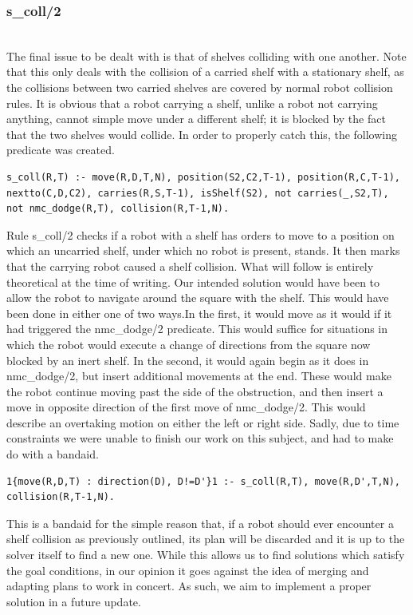 \documentclass{llncs}
\begin{document}
\subsubsection{s\_coll/2}\hfill\\
The final issue to be dealt with is that of shelves colliding with one another. Note that this only deals with the collision of a carried shelf with a stationary shelf, as the collisions between two carried shelves are covered by normal robot collision rules.\newline
It is obvious that a robot carrying a shelf, unlike a robot not carrying anything, cannot simple move under a different shelf; it is blocked by the fact that the two shelves would collide. In order to properly catch this, the following predicate was created.
\begin{lstlisting}[basicstyle=\fontsize{9}{11}\selectfont\ttfamily,frame=single,breaklines=true]
s_coll(R,T) :- move(R,D,T,N), position(S2,C2,T-1), position(R,C,T-1), nextto(C,D,C2), carries(R,S,T-1), isShelf(S2), not carries(_,S2,T), not nmc_dodge(R,T), collision(R,T-1,N).
\end{lstlisting}
Rule s\_coll/2 checks if a robot with a shelf has orders to move to a position on which an uncarried shelf, under which no robot is present, stands. It then marks that the carrying robot caused a shelf collision.\newline\newline
What will follow is entirely theoretical at the time of writing. Our intended solution would have been to allow the robot to navigate around the square with the shelf. This would have been done in either one of two ways.\newline In the first, it would move as it would if it had triggered the nmc\_dodge/2 predicate. This would suffice for situations in which the robot would execute a change of directions from the square now blocked by an inert shelf.\newline
In the second, it would again begin as it does in nmc\_dodge/2, but insert additional movements at the end. These would make the robot continue moving past the side of the obstruction, and then insert a move in opposite direction of the first move of nmc\_dodge/2. This would describe an overtaking motion on either the left or right side. \newline\newline
Sadly, due to time constraints we were unable to finish our work on this subject, and had to make do with a bandaid.
\begin{lstlisting}[basicstyle=\fontsize{9}{11}\selectfont\ttfamily,frame=single,breaklines=true]
1{move(R,D,T) : direction(D), D!=D'}1 :- s_coll(R,T), move(R,D',T,N), collision(R,T-1,N).
\end{lstlisting}
This is a bandaid for the simple reason that, if a robot should ever encounter a shelf collision as previously outlined, its plan will be discarded and it is up to the solver itself to find a new one. \newline While this allows us to find solutions which satisfy the goal conditions, in our opinion it goes against the idea of merging and adapting plans to work in concert. As such, we aim to implement a proper solution in a future update.
\end{document}
